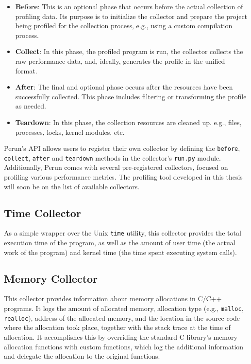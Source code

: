 \begin{itemize}
    \item \textbf{Before}: This is an optional phase that occurs before the actual collection of profiling data. Its purpose is to initialize the collector and prepare the project being profiled for the collection process, e.g., using a custom compilation process.
    \item \textbf{Collect}: In this phase, the profiled program is run, the collector collects the raw performance data, and, ideally, generates the profile in the unified format.
    \item \textbf{After}: The final and optional phase occurs after the resources have been successfully collected. This phase includes filtering or transforming the profile as needed.
    \item \textbf{Teardown}: In this phase, the collection resources are cleaned up. e.g., files, processes, locks, kernel modules, etc.
\end{itemize}

\noindent
Perun's API allows users to register their own collector by defining the \verb|before|, \verb|collect|, \verb|after| and \verb|teardown| methods in the collector's \verb|run.py| module. Additionally, Perun comes with several pre-registered collectors, focused on profiling various performance metrics. The profiling tool developed in this thesis will soon be on the list of available collectors.


\subsection{Time Collector}
As a simple wrapper over the Unix \verb|time| utility, this collector provides the total execution time of the program, as well as the amount of user time (the actual work of the program) and kernel time (the time spent executing system calls).

\subsection{Memory Collector}
This collector provides information about memory allocations in C/C++ programs. It logs the amount of allocated memory, allocation type (e.g., \texttt{malloc}, \texttt{realloc}), address of the allocated memory, and the location in the source code where the allocation took place, together with the stack trace at the time of allocation. It accomplishes this by overriding the standard C library's memory allocation functions with custom functions, which log the additional information and delegate the allocation to the original functions. \cite{memory-collector}


